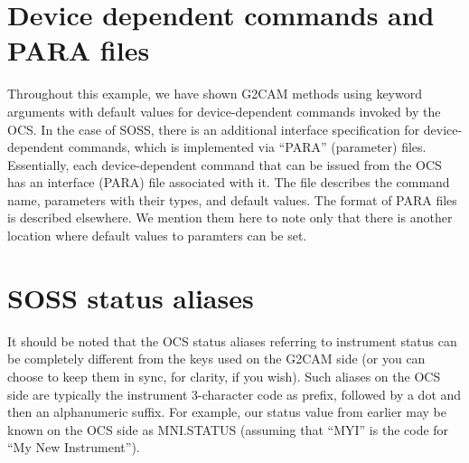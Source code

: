 \documentclass[11pt]{report}
\begin{document}
\section{Device dependent commands and PARA files}
Throughout this example, we have shown G2CAM methods using keyword
arguments with default values for device-dependent commands invoked by
the OCS. In the case of SOSS, there is an additional interface
specification for device-dependent commands, which is implemented via
``PARA'' (parameter) files. Essentially, each device-dependent command
that can be issued from the OCS has an interface (PARA) file associated
with it. The file describes the command name, parameters with their
types, and default values. The format of PARA files is described
elsewhere. We mention them here to note only that there is another
location where default values to paramters can be set. 

\section{SOSS status aliases}
It should be noted that the OCS status aliases referring to instrument
status can be completely different from the keys used on the G2CAM side
(or you can choose to keep them in sync, for clarity, if you wish). Such
aliases on the OCS side are typically the instrument 3-character code as
prefix, followed by a dot and then an alphanumeric suffix. For example,
our status value from earlier may be known on the OCS side as MNI.STATUS
(assuming that ``MYI'' is the code for ``My New Instrument'').  
\end{document}

